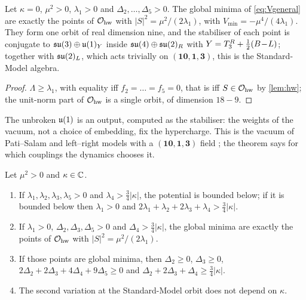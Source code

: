 \begin{theorem}
\label{thm:select0}
Let $\kappa=0$, $\mu^2>0$, $\lambda_1>0$ and $\Delta_2,\dots,\Delta_5>0$. The global minima of \eqref{eq:Vgeneral} are exactly the points of $\mathcal O_{\rm hw}$ with
$|S|^2=\mu^2/(2\lambda_1)$, with $V_{\min}=-\mu^4/(4\lambda_1)$. They form one orbit of real dimension nine, and the stabiliser of each point is conjugate to
$\mathfrak{su}(3)\oplus\mathfrak{u}(1)_Y$ inside $\mathfrak{su}(4)\oplus\mathfrak{su}(2)_R$ with $Y=T^R_3+\tfrac12(B\!-\!L)$; together with $\mathfrak{su}(2)_L$, which acts trivially on $(\mathbf{10},\mathbf1,\mathbf3)$, this is the
Standard-Model algebra.
\end{theorem}

\begin{proof}
$\Lambda\ge\lambda_1$, with equality iff $f_2=\dots=f_5=0$, that is iff $S\in\mathcal O_{\rm hw}$ by \cref{lem:hw}; the unit-norm part of $\mathcal O_{\rm hw}$ is a single
orbit, of dimension $18-9$.
\end{proof}

The unbroken $\mathfrak{u}(1)$ is an output, computed as the stabiliser: the weights of the vacuum, not a choice of embedding, fix the hypercharge. This is the
vacuum of Pati--Salam and left--right models with a $(\mathbf{10},\mathbf1,\mathbf3)$ field \cite{PatiSalam,MohapatraSenjanovic81}; the theorem says for which couplings
the dynamics chooses it.

\begin{theorem}
\label{thm:selectk}
Let $\mu^2>0$ and $\kappa\in\mathbb{C}$.
\begin{enumerate}[label=(\alph*),leftmargin=2.2em]
\item If $\lambda_1,\lambda_2,\lambda_3,\lambda_5>0$ and $\lambda_4>\tfrac34|\kappa|$, the potential is bounded below; if it is bounded below then $\lambda_1>0$ and
$2\lambda_1+\lambda_2+2\lambda_3+\lambda_4>\tfrac34|\kappa|$.
\item If $\lambda_1>0$, $\Delta_2,\Delta_3,\Delta_5>0$ and $\Delta_4>\tfrac34|\kappa|$, the global minima are exactly the points of $\mathcal O_{\rm hw}$ with
$|S|^2=\mu^2/(2\lambda_1)$.
\item If those points are global minima, then $\Delta_2\ge0$, $\Delta_3\ge0$, $2\Delta_2+2\Delta_3+4\Delta_4+9\Delta_5\ge0$ and
$\Delta_2+2\Delta_3+\Delta_4\ge\tfrac34|\kappa|$.
\item The second variation at the Standard-Model orbit does not depend on $\kappa$.
\end{enumerate}
\end{theorem}

